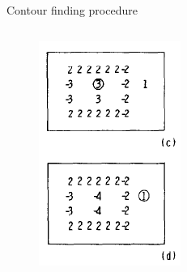 \documentclass[12pt, dvipsnames]{beamer}
\begin{document}
\begin{frame}{Contour finding procedure \footnotemark}
\begin{columns}
\begin{figure}
            \centering
            \includegraphics[width=1\textwidth]{resources/sudoku/border_follow_2.png}
        \end{figure}
    \end{columns}
    \vspace{0.5em}
\end{frame}
\end{document}
